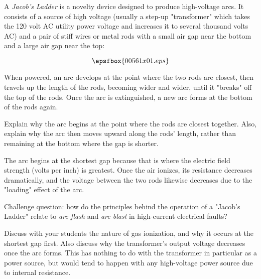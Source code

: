 

A {\it Jacob's Ladder} is a novelty device designed to produce high-voltage arcs.  It consists of a source of high voltage (usually a step-up "transformer" which takes the 120 volt AC utility power voltage and increases it to several thousand volts AC) and a pair of stiff wires or metal rods with a small air gap near the bottom and a large air gap near the top:

$$\epsfbox{00561x01.eps}$$

When powered, an arc develops at the point where the two rods are closest, then travels up the length of the rods, becoming wider and wider, until it "breaks" off the top of the rods.  Once the arc is extinguished, a new arc forms at the bottom of the rods again.

Explain why the arc begins at the point where the rods are closest together.  Also, explain why the arc then moves upward along the rods' length, rather than remaining at the bottom where the gap is shorter.







The arc begins at the shortest gap because that is where the electric field strength (volts per inch) is greatest.  Once the air ionizes, its resistance decreases dramatically, and the voltage between the two rods likewise decreases due to the "loading" effect of the arc.

\vskip 10pt

Challenge question: how do the principles behind the operation of a "Jacob's Ladder" relate to {\it arc flash} and {\it arc blast} in high-current electrical faults?







Discuss with your students the nature of gas ionization, and why it occurs at the shortest gap first.  Also discuss why the transformer's output voltage decreases once the arc forms.  This has nothing to do with the transformer in particular as a power source, but would tend to happen with any high-voltage power source due to internal resistance. 

